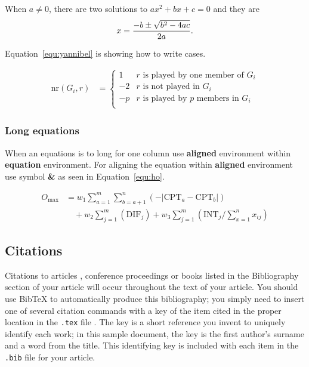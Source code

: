 \documentclass[article]{stucosrec}
\begin{document}
	When $a \ne 0$, there are two solutions to $ax^2 + bx + c = 0$ and they are $$x = {-b \pm \sqrt{b^2-4ac} \over 2a}.$$
	
	Equation~\ref{equ:yannibel} is showing how to write cases.
	
	\begin{equation}
		\begin{aligned} 
			\mathrm{nr}(G_i,r) & = 
\label{equ:yannibel}
			\begin{cases}
				1  & \text{$r$ is played by one member of $G_i$}\\
				-2 & \text{$r$ is not played in $G_i$} \\
				-p & \text{$r$ is played by $p$ members in $G_i$}\\
			\end{cases}
		\end{aligned}
	\end{equation}
	
	\subsubsection{Long equations}
	
	When an equations is to long for one column use \textbf{aligned} environment within \textbf{equation} environment.
	For aligning the equation within \textbf{aligned} environment use symbol \textbf{\&} as seen in Equation~\ref{equ:ho}.
	
	\begin{equation}
		\begin{aligned}
			O_{\max}& = w_1 \sum_{a=1}^{m} \sum_{b=a+1}^{n} (-\lvert\text{CPT}_a 
			-\text{CPT}_b\rvert)\\ 
			&\quad + w_2 \sum_{j=1}^{m} (\text{DIF}_j) + w_3 \sum_{j=1}^{m} 
			(\text{INT}_j/\sum_{x=1}^{n} x_{ij})
		\end{aligned}
		\label{equ:ho}
	\end{equation}
	
	\subsection{Citations}
	
	Citations to articles \cite{bowman:reasoning, clark:pct, braams:babel, herlihy:methodology},
conference
proceedings \cite{clark:pct} or books \cite{salas:calculus, Lamport:LaTeX} listed
	in the Bibliography section of your
article will occur throughout the text of your article.
	You should use BibTeX to automatically produce this bibliography;
you simply need to insert one of several citation commands with
a key of the item cited in the proper location in
the \texttt{.tex} file \cite{Lamport:LaTeX}.
	The key is a short reference you invent to uniquely
identify each work; in this sample document, the key is
the first author's surname and a
word from the title.
	This identifying key is included
with each item in the \texttt{.bib} file for your article.
	
\end{document}
